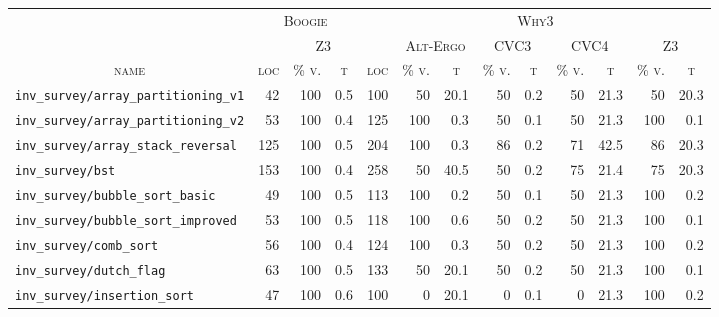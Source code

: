 \documentclass[a4paper,final]{llncs}
\newcommand{\Boogie}{Boogie\xspace}
\newcommand{\Why}{Why3\xspace}
\begin{document}
\begin{table}
\centering
\scriptsize
\begin{tabular}{l |r *{1}{rr} |r *{4}{rr}}
\multicolumn{1}{c}{} &
\multicolumn{3}{c}{\textsc{\Boogie}} &
\multicolumn{9}{c}{\textsc{\Why}}
\\
\multicolumn{1}{c}{} &
\multicolumn{1}{c}{} &
\multicolumn{2}{c}{\textsc{Z3}} &
\multicolumn{1}{c}{} &
\multicolumn{2}{c}{\textsc{Alt-Ergo}} &
\multicolumn{2}{c}{\textsc{CVC3}} &
\multicolumn{2}{c}{\textsc{CVC4}} &
\multicolumn{2}{c}{\textsc{Z3}}
\\
\multicolumn{1}{c}{\textsc{name}} &
\multicolumn{1}{c}{\textsc{loc}} &
\multicolumn{1}{c}{\textsc{\% v.}} &
\multicolumn{1}{c}{\textsc{t}} &
\multicolumn{1}{c}{\textsc{loc}} &
\multicolumn{1}{c}{\textsc{\% v.}} &
\multicolumn{1}{c}{\textsc{t}} &
\multicolumn{1}{c}{\textsc{\% v.}} &
\multicolumn{1}{c}{\textsc{t}} &
\multicolumn{1}{c}{\textsc{\% v.}} &
\multicolumn{1}{c}{\textsc{t}} &
\multicolumn{1}{c}{\textsc{\% v.}} &
\multicolumn{1}{c}{\textsc{t}}
\\
\hline
\verb|inv_survey/array_partitioning_v1|  &  42  &  100  &  0.5  &  100  &  50  &  20.1  &  50  &  0.2  &  50  &  21.3  &  50  &  20.3  \\
\verb|inv_survey/array_partitioning_v2|  &  53  &  100  &  0.4  &  125  &  100  &  0.3  &  50  &  0.1  &  50  &  21.3  &  100  &  0.1  \\
\verb|inv_survey/array_stack_reversal|  &  125  &  100  &  0.5  &  204  &  100  &  0.3  &  86  &  0.2  &  71  &  42.5  &  86  &  20.3  \\
\verb|inv_survey/bst|  &  153  &  100  &  0.4  &  258  &  50  &  40.5  &  50  &  0.2  &  75  &  21.4  &  75  &  20.3  \\
\verb|inv_survey/bubble_sort_basic|  &  49  &  100  &  0.5  &  113  &  100  &  0.2  &  50  &  0.1  &  50  &  21.3  &  100  &  0.2  \\
\verb|inv_survey/bubble_sort_improved|  &  53  &  100  &  0.5  &  118  &  100  &  0.6  &  50  &  0.2  &  50  &  21.3  &  100  &  0.1  \\
\verb|inv_survey/comb_sort|  &  56  &  100  &  0.4  &  124  &  100  &  0.3  &  50  &  0.2  &  50  &  21.3  &  100  &  0.2  \\
\verb|inv_survey/dutch_flag|  &  63  &  100  &  0.5  &  133  &  50  &  20.1  &  50  &  0.2  &  50  &  21.3  &  100  &  0.1  \\
\verb|inv_survey/insertion_sort|  &  47  &  100  &  0.6  &  100  &  0  &  20.1  &  0  &  0.1  &  0  &  21.3  &  100  &  0.2  \\

\end{tabular}
\end{table}
\end{document}
